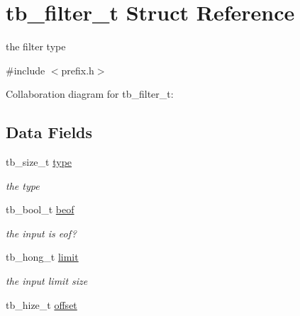 \hypertarget{structtb__filter__t}{\section{tb\-\_\-filter\-\_\-t Struct Reference}
\label{structtb__filter__t}
}


the filter type  




{\ttfamily \#include $<$prefix.\-h$>$}



Collaboration diagram for tb\-\_\-filter\-\_\-t\-:
\subsection*{Data Fields}
\begin{DoxyCompactItemize}
\item 
\hypertarget{structtb__filter__t_ab3ccace827f322e7c468bc33d2393ee1}{tb\-\_\-size\-\_\-t \hyperlink{structtb__filter__t_ab3ccace827f322e7c468bc33d2393ee1}{type}}\label{structtb__filter__t_ab3ccace827f322e7c468bc33d2393ee1}

\begin{DoxyCompactList}\small\item\em the type \end{DoxyCompactList}\item 
\hypertarget{structtb__filter__t_a14b2ed5e8101924ff2de61a421fd8431}{tb\-\_\-bool\-\_\-t \hyperlink{structtb__filter__t_a14b2ed5e8101924ff2de61a421fd8431}{beof}}\label{structtb__filter__t_a14b2ed5e8101924ff2de61a421fd8431}

\begin{DoxyCompactList}\small\item\em the input is eof? \end{DoxyCompactList}\item 
\hypertarget{structtb__filter__t_ac472e3386793f051499816d705300a1c}{tb\-\_\-hong\-\_\-t \hyperlink{structtb__filter__t_ac472e3386793f051499816d705300a1c}{limit}}\label{structtb__filter__t_ac472e3386793f051499816d705300a1c}

\begin{DoxyCompactList}\small\item\em the input limit size \end{DoxyCompactList}\item 
\hypertarget{structtb__filter__t_a8d7db0eda33632ab9b21a79660206c14}{tb\-\_\-hize\-\_\-t \hyperlink{structtb__filter__t_a8d7db0eda33632ab9b21a79660206c14}{offset}}\label{structtb__filter__t_a8d7db0eda33632ab9b21a79660206c14}


\end{DoxyCompactItemize}
